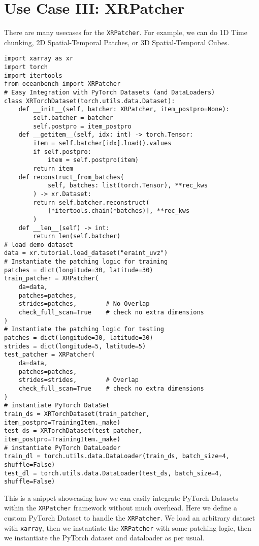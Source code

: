 \section{Use Case III: XRPatcher} \label{sec:xrpatcher}

There are many usecases for the \texttt{XRPatcher}. For example, we can do 1D Time chunking, 2D Spatial-Temporal Patches, or 3D Spatial-Temporal Cubes.


\begin{listing}[h!]
\begin{verbatim}
import xarray as xr
import torch
import itertools
from oceanbench import XRPatcher
# Easy Integration with PyTorch Datasets (and DataLoaders)
class XRTorchDataset(torch.utils.data.Dataset):
    def __init__(self, batcher: XRPatcher, item_postpro=None):
        self.batcher = batcher
        self.postpro = item_postpro
    def __getitem__(self, idx: int) -> torch.Tensor:
        item = self.batcher[idx].load().values
        if self.postpro:
            item = self.postpro(item)
        return item
    def reconstruct_from_batches(
            self, batches: list(torch.Tensor), **rec_kws
        ) -> xr.Dataset:
        return self.batcher.reconstruct(
            [*itertools.chain(*batches)], **rec_kws
        )
    def __len__(self) -> int:
        return len(self.batcher)
# load demo dataset
data = xr.tutorial.load_dataset("eraint_uvz")
# Instantiate the patching logic for training
patches = dict(longitude=30, latitude=30)
train_patcher = XRPatcher(
    da=data,
    patches=patches,
    strides=patches,        # No Overlap
    check_full_scan=True    # check no extra dimensions
)
# Instantiate the patching logic for testing
patches = dict(longitude=30, latitude=30)
strides = dict(longitude=5, latitude=5)
test_patcher = XRPatcher(
    da=data,
    patches=patches,
    strides=strides,        # Overlap
    check_full_scan=True    # check no extra dimensions
)
# instantiate PyTorch DataSet
train_ds = XRTorchDataset(train_patcher, item_postpro=TrainingItem._make)
test_ds = XRTorchDataset(test_patcher, item_postpro=TrainingItem._make)
# instantiate PyTorch DataLoader
train_dl = torch.utils.data.DataLoader(train_ds, batch_size=4, shuffle=False)
test_dl = torch.utils.data.DataLoader(test_ds, batch_size=4, shuffle=False)
\end{verbatim}
\label{listing:xrpatcher}
\caption{This is a snippet showcasing how we can easily integrate PyTorch Datasets within the \texttt{XRPatcher} framework without much overhead. Here we define a custom PyTorch Dataset to handle the \texttt{XRPatcher}. We load an arbitrary dataset with \texttt{xarray}, then we instantiate the \texttt{XRPatcher} with some patching logic, then we instantiate the PyTorch dataset and dataloader as per usual.}
\end{listing}




